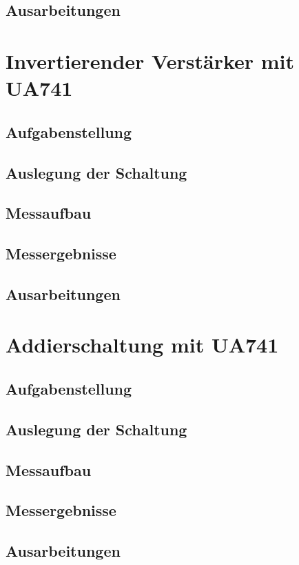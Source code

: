 		\subsection{Ausarbeitungen}

	\section{Invertierender Verstärker mit UA741 }
		\subsection{Aufgabenstellung}

		\subsection{Auslegung der Schaltung}

		\subsection{Messaufbau}

		\subsection{Messergebnisse}

		\subsection{Ausarbeitungen}

	\section{Addierschaltung mit UA741}
		\subsection{Aufgabenstellung}

		\subsection{Auslegung der Schaltung}

		\subsection{Messaufbau}

		\subsection{Messergebnisse}

		\subsection{Ausarbeitungen}
